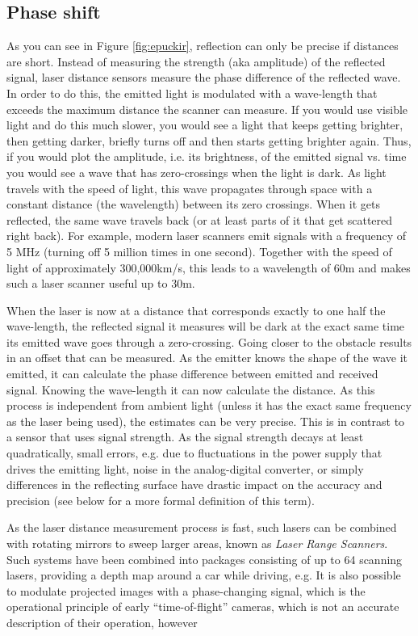 \subsection{Phase shift}
As you can see in Figure \ref{fig:epuckir}, reflection can only be precise if distances are short. Instead of measuring the strength (aka amplitude) of the reflected signal, laser distance sensors measure the phase difference of the reflected wave. In order to do this, the emitted light is modulated with a wave-length that exceeds the maximum distance the scanner can measure. If you would use visible light and do this much slower, you would see a light that keeps getting brighter, then getting darker, briefly turns off and then starts getting brighter again. Thus, if you would plot the amplitude, i.e. its brightness, of the emitted signal vs. time you would see a wave that has zero-crossings when the light is dark. As light travels with the speed of light, this wave propagates through space with a constant distance (the wavelength) between its zero crossings. When it gets reflected, the same wave travels back (or at least parts of it that get scattered right back). For example, modern laser scanners emit signals with a frequency of 5 MHz (turning off 5 million times in one second). Together with the speed of light of approximately 300,000km/s, this leads to a wavelength of 60m and makes such a laser scanner useful up to 30m.

When the laser is now at a distance that corresponds exactly to one half the wave-length, the reflected signal it measures will be dark at the exact same time its emitted wave goes through a zero-crossing. Going closer to the obstacle results in an offset that can be measured. As the emitter knows the shape of the wave it emitted, it can calculate the phase difference between emitted and received signal. Knowing the wave-length it can now calculate the distance. As this process is independent from ambient light (unless it has the exact same frequency as the laser being used), the estimates can be very precise. This is in contrast to a sensor that uses signal strength. As the signal strength decays at least quadratically, small errors, e.g. due to fluctuations in the power supply that drives the emitting light, noise in the analog-digital converter, or simply differences in the reflecting surface have drastic impact on the accuracy and precision (see below for a more formal definition of this term). 

As the laser distance measurement process is fast, such lasers can be combined with rotating mirrors to sweep larger areas, known as \emph{Laser Range Scanners}. Such systems have been combined into packages consisting of up to 64 scanning lasers, providing a depth map around a car while driving, e.g. It is also possible to modulate projected images with a phase-changing signal, which is the operational principle of early ``time-of-flight'' cameras, which is not an accurate description of their operation, however


